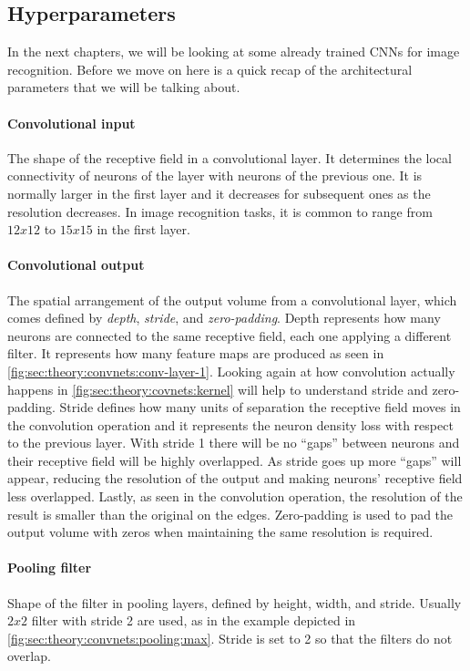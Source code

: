 \subsection{Hyperparameters}
\label{sub:theory:convnets:achitecture}

In the next chapters, we will be looking at some already trained CNNs for image recognition.
Before we move on here is a quick recap of the architectural parameters that we will be talking about.

\paragraph{Convolutional input}
The shape of the receptive field in a convolutional layer.
It determines the local connectivity of neurons of the layer with neurons of the previous one.
It is normally larger in the first layer and it decreases for subsequent ones as the resolution decreases.
In image recognition tasks, it is common to range from $12x12$ to $15x15$ in the first layer.

\paragraph{Convolutional output}
The spatial arrangement of the output volume from a convolutional layer, which comes defined by \emph{depth}, \emph{stride}, and \emph{zero-padding}.
Depth represents how many neurons are connected to the same receptive field, each one applying a different filter.
It represents how many feature maps are produced as seen in \autoref{fig:sec:theory:convnets:conv-layer-1}.
Looking again at how convolution actually happens in \autoref{fig:sec:theory:covnets:kernel} will help to understand stride and zero-padding.
Stride defines how many units of separation the receptive field moves in the convolution operation and it represents the neuron density loss with respect to the previous layer.
With stride 1 there will be no ``gaps'' between neurons and their receptive field will be highly overlapped.
As stride goes up more ``gaps'' will appear, reducing the resolution of the output and making neurons' receptive field less overlapped.
Lastly, as seen in the convolution operation, the resolution of the result is smaller than the original on the edges.
Zero-padding is used to pad the output volume with zeros when maintaining the same resolution is required.

\paragraph{Pooling filter}
Shape of the filter in pooling layers, defined by height, width, and stride.
Usually $2x2$ filter with stride 2 are used, as in the example depicted in \autoref{fig:sec:theory:convnets:pooling:max}.
Stride is set to 2 so that the filters do not overlap.
